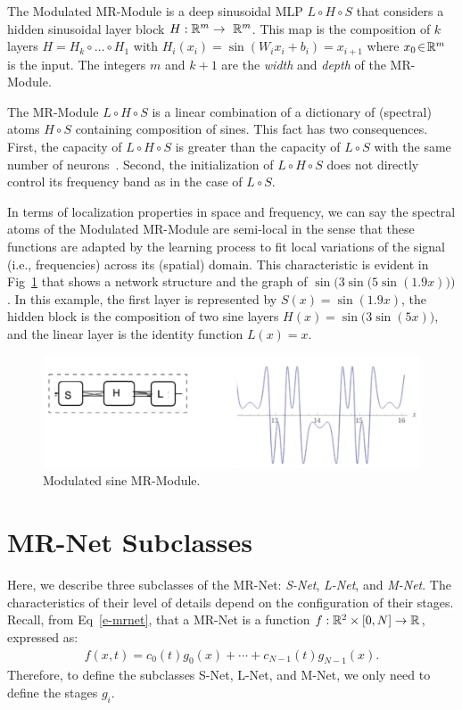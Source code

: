 The Modulated MR-Module is a deep sinusoidal MLP $L\circ H\circ S$ that considers a hidden sinusoidal layer block $H:\mathbb{R}^m\to~\mathbb{R}^m$. 
This map is the composition of $k$ layers $H=H_k\circ \dots \circ H_1$ with $H_i(x_i)\!=\!\sin\left(W_i x_i \!+\! b_i\right)\!=\!x_{i+1}$ where $x_0\!\in\!\mathbb{R}^m$ is the input.
The integers $m$ and $k+1$ are the \textit{width} and \textit{depth} of the MR-Module.  

The MR-Module $L\circ H\circ S$ is a linear combination of a dictionary of (spectral) atoms $H\circ S$ containing composition of sines. This fact has two consequences. First, the capacity of $L\circ H\circ S$ is greater than the capacity of $L\circ S$ with the same number of neurons~\cite{novello2022understanding}. Second, the initialization of $L\circ H\circ S$ does not directly control its frequency band as in the case of $L\circ S$.

In terms of localization properties in space and frequency, we can say the spectral atoms of the Modulated MR-Module are semi-local in the sense that these functions are adapted by the learning process to fit local variations of the signal (i.e., frequencies) across its (spatial) domain. This characteristic is evident in Fig~\ref{f:modulated} that shows a network structure and the graph of $\sin\Big(3\sin\big(5\sin(1.9x)\big)\Big)$.
In this example, the first layer is represented by $S(x)=\sin(1.9 x)$, the hidden block is the composition of two sine layers $H(x)=\sin\big(3\sin(5x)\big)$, and the linear layer is the identity function $L(x)=x$.

\begin{figure}[!h]
\centering
\includegraphics[width=0.9\linewidth]{img/ch4/modulated-sine.png}
\caption{Modulated sine MR-Module.}
\label{f:modulated}
\end{figure}



\section{MR-Net Subclasses}

Here, we describe three subclasses of the MR-Net: \emph{S-Net}, \emph{L-Net}, and \emph{M-Net}.
The characteristics of their level of details depend on the configuration of their stages. %
Recall, from Eq~\ref{e-mrnet}, that a MR-Net is a function $f:\mathbb{R}^2\times [0,N]\to \mathbb{R}$, expressed as:
\begin{align*}
f(x,t) = c_0(t)g_0(x) + \cdots + c_{N-1}(t)g_{N-1}(x).
\end{align*}
Therefore, to define the subclasses S-Net, L-Net, and M-Net, we only need to define the stages $g_i$.



